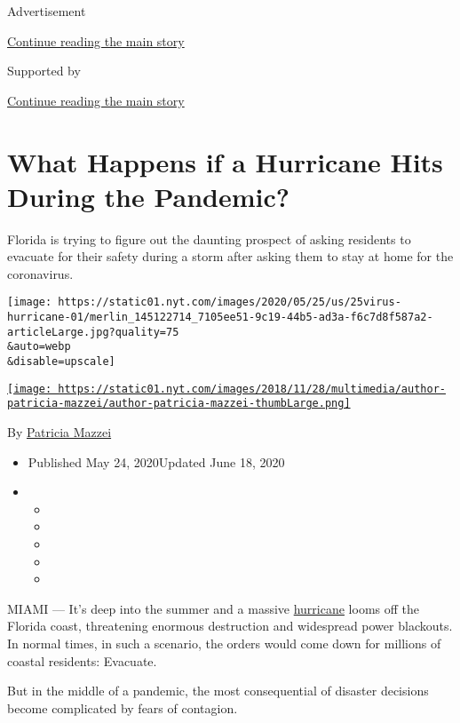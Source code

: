 Advertisement

\protect\hyperlink{after-top}{Continue reading the main story}

Supported by

\protect\hyperlink{after-sponsor}{Continue reading the main story}

\hypertarget{what-happens-if-a-hurricane-hits-during-the-pandemic}{%
\section{What Happens if a Hurricane Hits During the
Pandemic?}\label{what-happens-if-a-hurricane-hits-during-the-pandemic}}

Florida is trying to figure out the daunting prospect of asking
residents to evacuate for their safety during a storm after asking them
to stay at home for the coronavirus.

\texttt{[image: https://static01.nyt.com/images/2020/05/25/us/25virus-hurricane-01/merlin\_145122714\_7105ee51-9c19-44b5-ad3a-f6c7d8f587a2-articleLarge.jpg?quality=75\\\&auto=webp\\\&disable=upscale]}

\href{https://www.nytimes.com/by/patricia-mazzei}{\texttt{[image: https://static01.nyt.com/images/2018/11/28/multimedia/author-patricia-mazzei/author-patricia-mazzei-thumbLarge.png]}}

By \href{https://www.nytimes.com/by/patricia-mazzei}{Patricia Mazzei}

\begin{itemize}
\item
  Published May 24, 2020Updated June 18, 2020
\item
  \begin{itemize}
  \item
  \item
  \item
  \item
  \item
  \end{itemize}
\end{itemize}

MIAMI --- It's deep into the summer and a massive
\href{https://www.nytimes.com/2020/07/26/us/hurricane-douglas-hawaii.html}{hurricane}
looms off the Florida coast, threatening enormous destruction and
widespread power blackouts. In normal times, in such a scenario, the
orders would come down for millions of coastal residents: Evacuate.

But in the middle of a pandemic, the most consequential of disaster
decisions become complicated by fears of contagion.

